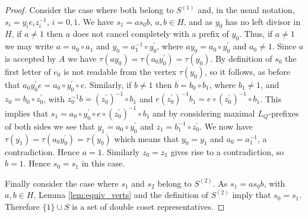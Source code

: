 \documentclass[a4paper,12pt]{article}
\renewcommand{\t}{\tau }
\numberwithin{equation}{section}
\numberwithin{figure}{section}
\begin{document}
\begin{proof}
Consider the case where both belong to $S^{(1)}$ and, in the usual notation,
$s_i=y_i e_i z_i^{-1}$, $i=0,1$. We have $s_1=as_0b$, $a,b\in H$, and as $y_0$ has
no left divisor in $H$, if $a\neq 1$ then $a$ does not cancel completely with
 a prefix of $y_0$. Thus, if $a\neq 1$ we may write $a=a_0\circ a_1$ and
$y_0=a_1^{-1}\circ y_0^\prime$, where $ay_0=a_0\circ y_0^\prime$
and $a_0\neq 1$. Since
$a$ is accepted by $A$ we have $\t(ay_0)=\t(a_0y_0^\prime)=\t(y_0)$. By definition
of $s_0$ the first letter of $e_0$ is not readable from the vertex $\t(y_0)$, so
it follows, as before that $a_0y_0^\prime e=a_0\circ y_0^\prime \circ e$. Similarly,
if $b\neq 1$ then $b=b_0\circ b_1$, where $b_1\neq 1$,  and $z_0=b_0\circ z_0^\prime$, with
$z_0^{-1}b= (z_0^\prime)^{-1}\circ b_1$ and $e (z_0^\prime)^{-1}b_1=
e\circ  (z_0^\prime)^{-1}\circ b_1$. This implies that
$s_1=a_0\circ y_0^\prime \circ  e\circ  (z_0^\prime)^{-1}\circ b_1$ and by considering
maximal $L_Q$-prefixes of both sides we see that $y_1=a_0\circ y_0^\prime$ and
$z_1=b_1^{-1}\circ z_0^\prime$. We now have  $\t(y_1)=\t(a_0y_0^\prime)=\t(y_0)$ which
 means that
$y_0=y_1$ and $a_0=a_1^{-1}$,  a contradiction. Hence $a=1$.
Similarly $z_0=z_1$ gives rise to  a contradiction, so $b=1$.
Hence $s_0=s_1$ in this case.

Finally consider the case where $s_1$ and $s_2$ belong to
$S^{(2)}$. As $s_1=as_0b$, with $a,b\in H$, Lemma
\ref{lem:equiv_verts} and the definition of $S^{(2)}$ imply  that
$s_0= s_1$. Therefore $\{1\}\cup S$ is a set of double coset
representatives.
\end{proof}
\end{document}
